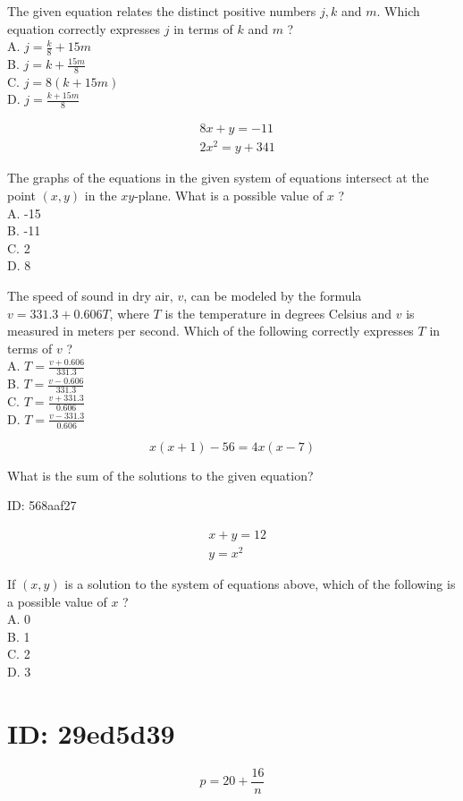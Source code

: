 The given equation relates the distinct positive numbers $j, k$ and $m$. Which equation correctly expresses $j$ in terms of $k$ and $m$ ?\\
A. $j=\frac{k}{8}+15 m$\\
B. $j=k+\frac{15 m}{8}$\\
C. $j=8(k+15 m)$\\
D. $j=\frac{k+15 m}{8}$

$$
\begin{aligned}
& 8 x+y=-11 \\
& 2 x^{2}=y+341
\end{aligned}
$$

The graphs of the equations in the given system of equations intersect at the point $(x, y)$ in the $x y$-plane. What is a possible value of $x$ ?\\
A. -15\\
B. -11\\
C. 2\\
D. 8

The speed of sound in dry air, $v$, can be modeled by the formula $v=331.3+0.606 T$, where $T$ is the temperature in degrees Celsius and $v$ is measured in meters per second. Which of the following correctly expresses $T$ in terms of $v$ ?\\
A. $T=\frac{v+0.606}{331.3}$\\
B. $T=\frac{v-0.606}{331.3}$\\
C. $T=\frac{v+331.3}{0.606}$\\
D. $T=\frac{v-331.3}{0.606}$

$$
x(x+1)-56=4 x(x-7)
$$

What is the sum of the solutions to the given equation?

ID: 568aaf27

$$
\begin{aligned}
& x+y=12 \\
& y=x^{2}
\end{aligned}
$$

If $(x, y)$ is a solution to the system of equations above, which of the following is a possible value of $x$ ?\\
A. 0\\
B. 1\\
C. 2\\
D. 3

\section*{ID: 29ed5d39}
$$
p=20+\frac{16}{n}
$$

